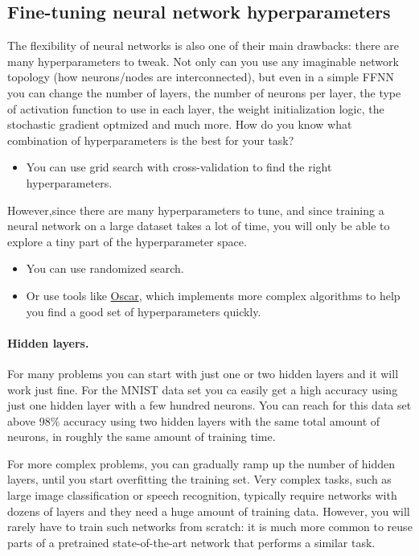 \subsection*{Fine-tuning neural network hyperparameters}

The flexibility of neural networks is also one of their main
drawbacks: there are many hyperparameters to tweak. Not only can you
use any imaginable network topology (how neurons/nodes are interconnected),
but even in a simple FFNN you can change the number of layers, the
number of neurons per layer, the type of activation function to use in
each layer, the weight initialization logic, the stochastic gradient optmized and much more. How do you
know what combination of hyperparameters is the best for your task?

\begin{itemize}
\item You can use grid search with cross-validation to find the right hyperparameters.
\end{itemize}

\noindent
However,since there are many hyperparameters to tune, and since
training a neural network on a large dataset takes a lot of time, you
will only be able to explore a tiny part of the hyperparameter space.

\begin{itemize}
\item You can use randomized search.

\item Or use tools like \href{{http://oscar.calldesk.ai/}}{Oscar}, which implements more complex algorithms to help you find a good set of hyperparameters quickly.  
\end{itemize}

\noindent
\paragraph{Hidden layers.}
For many problems you can start with just one or two hidden layers and it will work just fine.
For the MNIST data set you ca easily get a high accuracy using just one hidden layer with a
few hundred neurons.
You can reach for this data set above 98\% accuracy using two hidden layers with the same total amount of
neurons, in roughly the same amount of training time. 

For more complex problems, you can gradually
ramp up the number of hidden layers, until you start overfitting the training set. Very complex tasks, such
as large image classification or speech recognition, typically require networks with dozens of layers
and they need a huge amount
of training data. However, you will rarely have to train such networks from scratch: it is much more
common to reuse parts of a pretrained state-of-the-art network that performs a similar task.

